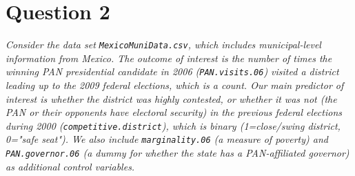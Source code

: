 \documentclass[12pt,letterpaper]{article}
\begin{document}
	\section*{Question 2}
\vspace{.25cm}
\noindent \emph{Consider the data set \texttt{MexicoMuniData.csv}, which includes municipal-level information from Mexico. The outcome of interest is the number of times the winning PAN presidential candidate in 2006 (\texttt{PAN.visits.06}) visited a district leading up to the 2009 federal elections, which is a count. Our main predictor of interest is whether the district was highly contested, or whether it was not (the PAN or their opponents have electoral security) in the previous federal elections during 2000 (\texttt{competitive.district}), which is binary (1=close/swing district, 0="safe seat"). We also include \texttt{marginality.06} (a measure of poverty) and \texttt{PAN.governor.06} (a dummy for whether the state has a PAN-affiliated governor) as additional control variables. }
\end{document}
